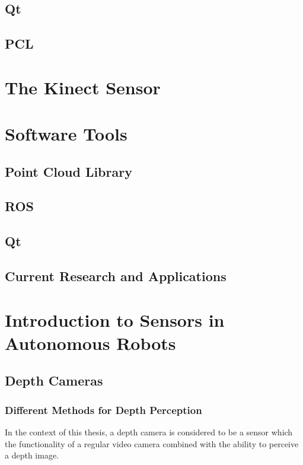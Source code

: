 \subsection{Qt}

\subsection{PCL}

\section{The Kinect Sensor}

\section{Software Tools}

\subsection{Point Cloud Library}

\subsection{ROS}

\subsection{Qt}


\subsection{Current Research and Applications}

\section{Introduction to Sensors in Autonomous Robots}

\subsection{Depth Cameras}

\subsubsection{Different Methods for Depth Perception}

In the context of this thesis, a depth camera is considered to be a sensor which the functionality of a regular video camera combined with the ability to perceive a depth image.

